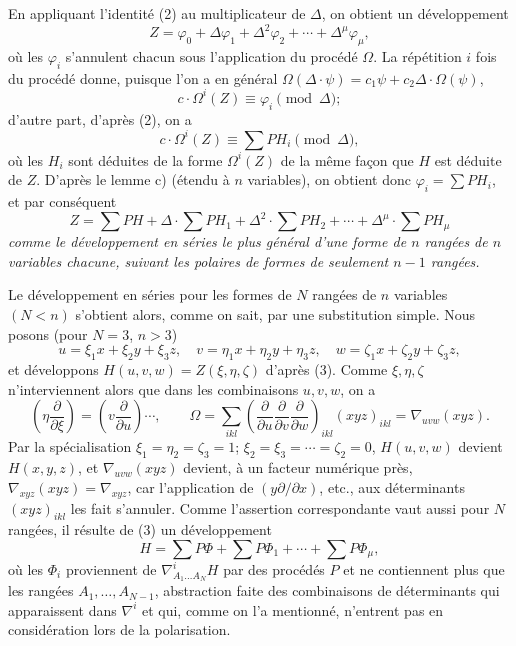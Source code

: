 En appliquant l'identité (2) au multiplicateur de $\Delta$, on obtient un développement
\[
  Z=\varphi_0+\Delta\varphi_1+\Delta^2\varphi_2+\cdots+\Delta^\mu\varphi_\mu,
\]
où les $\varphi_i$ s'annulent chacun sous l'application du procédé $\Omega$. La répétition $i$ fois du procédé donne, puisque l'on a en général $\Omega(\Delta\cdot\psi)=c_1\psi+c_2\Delta\cdot\Omega(\psi)$,
\[
  c\cdot \Omega^i(Z)\equiv\varphi_i\pmod{\Delta};
\]
d'autre part, d'après (2), on a
\[
  c\cdot\Omega^i(Z)\equiv\sum PH_i\pmod{\Delta},
\]
où les $H_i$ sont déduites de la forme $\Omega^i(Z)$ de la même façon que $H$ est déduite de $Z$. D'après le lemme c) (étendu à $n$ variables), on obtient donc $\varphi_i=\sum PH_i$, et par conséquent
\begin{equation}
  Z=\sum PH+\Delta\cdot\sum PH_1+\Delta^2\cdot\sum PH_2+
  \cdots+\Delta^\mu\cdot\sum PH_\mu
\tag{3}
\end{equation}
\emph{comme le développement en séries le plus général d'une forme de $n$ rangées de $n$ variables chacune, suivant les polaires de formes de seulement $n-1$ rangées.}

Le développement en séries pour les formes de $N$ rangées de $n$ variables $(N<n)$ s'obtient alors, comme on sait, par une substitution simple. Nous posons (pour $N=3$, $n>3$)
\[
  u=\xi_1x+\xi_2y+\xi_3z,
  \quad v=\eta_1x+\eta_2y+\eta_3z,
  \quad w=\zeta_1x+\zeta_2y+\zeta_3z,
\]
et développons $H(u,v,w)=Z(\xi,\eta,\zeta)$ d'après (3). Comme $\xi,\eta,\zeta$ n'interviennent alors que dans les combinaisons $u,v,w$, on a
\[
  \left(\eta\frac{\partial}{\partial \xi}\right)=
  \left(v\frac{\partial}{\partial u}\right)\cdots,
  \qquad
  \Omega=\sum_{ikl}\left(\frac{\partial}{\partial u}
  \frac{\partial}{\partial v}
  \frac{\partial}{\partial w}\right)_{ikl}(xyz)_{ikl}
  =\nabla_{uvw}(xyz).
\]
Par la spécialisation $\xi_1=\eta_2=\zeta_3=1$; $\xi_2=\xi_3=\cdots=\zeta_2=0$, $H(u,v,w)$ devient $H(x,y,z)$, et $\nabla_{uvw}(xyz)$ devient, à un facteur numérique près, $\nabla_{xyz}(xyz)=\nabla_{xyz}$, car l'application de $(y\partial/\partial x)$, etc., aux déterminants $(xyz)_{ikl}$ les fait s'annuler. Comme l'assertion correspondante vaut aussi pour $N$ rangées, il résulte de (3) un développement
\begin{equation}
  H=\sum P\Phi+\sum P\Phi_1+\cdots+\sum P\Phi_\mu,
\tag{4}
\end{equation}
où les $\Phi_i$ proviennent de $\nabla^i_{A_1\ldots A_N}H$ par des procédés $P$ et ne contiennent plus que les rangées $A_1,\ldots,A_{N-1}$, abstraction faite des combinaisons de déterminants qui apparaissent dans $\nabla^i$ et qui, comme on l'a mentionné, n'entrent pas en considération lors de la polarisation.

